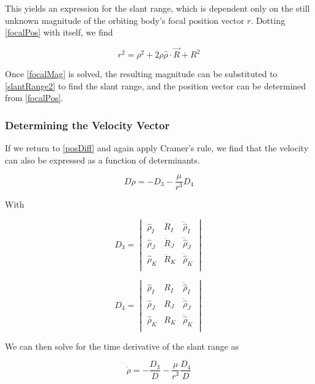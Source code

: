 \documentclass[11pt,twoside,letterpaper]{article}
\begin{document}
  This yields an expression for the slant range, which is dependent
  only on the still unknown magnitude of the orbiting body's focal
  position vector $r$. Dotting \ref{focalPos} with itself, we find

  \begin{equation} \label{focalMag}
    r^2 = \rho^2 + 2\rho \hat{\rho}\cdot\vec{R} + R^2
  \end{equation}

  Once \ref{focalMag} is solved, the resulting magnitude can be
  substituted to \ref{slantRange2} to find the slant range, and the
  position vector can be determined from \ref{focalPos}.

  \subsubsection{Determining the Velocity Vector}
  If we return to \ref{posDiff} and again apply Cramer's rule, we find
  that the velocity can also be expressed as a function of determinants.

  \begin{equation} \label{slantVelocity}
    D\dot{\rho} = -D_3 - \frac{\mu}{r^3}D_4
  \end{equation}

  With

  \begin{equation} \label{D3}
    D_3 = \begin{vmatrix}
    \hat{\rho}_I& \ddot{R}_I& \ddot{\hat{\rho}}_I \\
    \hat{\rho}_J& \ddot{R}_J& \ddot{\hat{\rho}}_J \\
    \hat{\rho}_K& \ddot{R}_K& \ddot{\hat{\rho}}_K \\
    \end{vmatrix}
  \end{equation}

  \begin{equation} \label{D4}
    D_4 = \begin{vmatrix}
    \hat{\rho}_I& R_I& \ddot{\hat{\rho}}_I \\
    \hat{\rho}_J& R_J& \ddot{\hat{\rho}}_J \\
    \hat{\rho}_K& R_K& \ddot{\hat{\rho}}_K \\
    \end{vmatrix}
  \end{equation}

  We can then solve for the time derivative of the slant range as

  \begin{equation} \label{slantDot}
    \dot{\rho} = -\frac{D_3}{D} - \frac{\mu}{r^3}\frac{D_4}{D}
  \end{equation}
\end{document}
